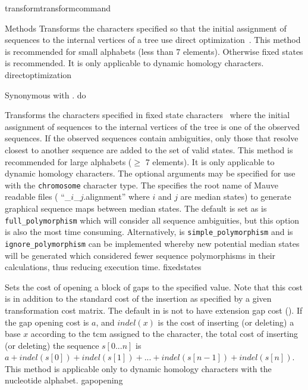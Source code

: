 \begin{command}{transform}{transformcommand}
\begin{arguments}
\begin{argumentgroup}{Methods}
          {Transforms the characters specified so that the initial assignment of sequences to 
          the internal vertices of a tree use direct
          optimization~\cite{wheeler1996}. This method is recommended for small
          alphabets (less than 7 elements). Otherwise fixed states is
          recommended. It is only applicable to dynamic homology
          characters.}
          {directoptimization}

          {Synonymous with .}
          {do}
          
          {Transforms the characters specified in fixed state characters~\cite{wheeler1999a}
          where the initial assignment of sequences to the internal vertices of
          the tree is one of the observed sequences. If the observed sequences
          contain ambiguities, only those that resolve closest to another
          sequence are added to the set of valid states. This method is
          recommended for large alphabets ($\ge$ 7 elements). It is only
          applicable to dynamic homology characters.  The optional arguments 
          may be specified for use with the \texttt{chromosome} character type.  
          The \poystring specifies the root name of Mauve \cite{darlingetal2004} 
          readable files ( ``\poystring\_$i$\_$j$.alignment'' where $i$ and $j$ are 
          median states) to generate graphical sequence maps between median states.  
          The default is set as \poylident is \texttt{full\_polymorphism} which will 
          consider all sequence ambiguities, but this option is also the most 
           time consuming. Alternatively, \poylident is \texttt{simple\_polymorphism} 
           and \poylident is \texttt{ignore\_polymorphism} can be implemented whereby 
           new potential median states will be generated which considered fewer 
           sequence polymorphisms in their calculations, thus reducing execution time.}
          {fixedstates}
          
            {Sets the cost of opening a block of gaps to the specified value. Note that
            this cost is in addition to the standard cost of the insertion as
            specified by a given transformation cost matrix.
            The default in \poy is not to have extension
            gap cost (). If the gap
            opening cost is
            $a$, and $indel(x)$ is the cost of inserting (or deleting) a
            base $x$ according to the tcm assigned to the character, the total
            cost of inserting (or deleting) the sequence $s[0...n]$ is $a +
            indel(s[0]) + indel(s[1]) + ... + indel(s[n - 1]) + indel(s[n]).$
            This method is applicable only to dynamic homology characters with
            the nucleotide alphabet.} 
            {gapopening}


\end{argumentgroup}
\end{arguments}
\end{command}
